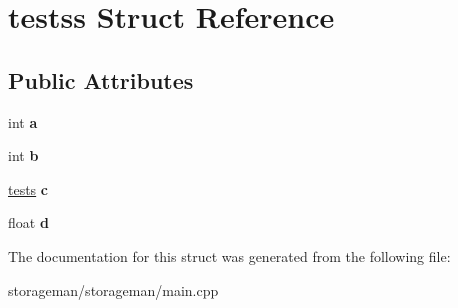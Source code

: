 \hypertarget{structtestss}{\section{testss Struct Reference}
\label{structtestss}
}
\subsection*{Public Attributes}
\begin{DoxyCompactItemize}
\item 
\hypertarget{structtestss_ae916d1791f70d60e93ce69d8e05fe316}{int {\bfseries a}}\label{structtestss_ae916d1791f70d60e93ce69d8e05fe316}

\item 
\hypertarget{structtestss_a3e01b19d3e897747e8153f9bc5994fe5}{int {\bfseries b}}\label{structtestss_a3e01b19d3e897747e8153f9bc5994fe5}

\item 
\hypertarget{structtestss_a7ce28bf11e1e05ebd4876bf23d01d523}{\hyperlink{structtests}{tests} {\bfseries c}}\label{structtestss_a7ce28bf11e1e05ebd4876bf23d01d523}

\item 
\hypertarget{structtestss_aaf1c0ca6a5bbc166817293e9001f2d04}{float {\bfseries d}}\label{structtestss_aaf1c0ca6a5bbc166817293e9001f2d04}

\end{DoxyCompactItemize}


The documentation for this struct was generated from the following file\-:\begin{DoxyCompactItemize}
\item 
storageman/storageman/main.\-cpp\end{DoxyCompactItemize}
